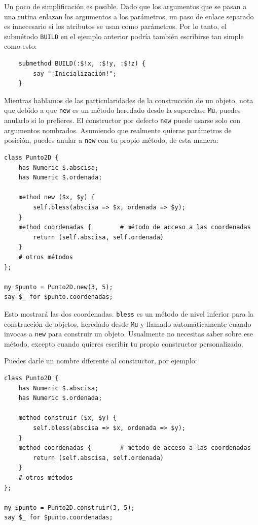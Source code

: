 Un poco de simplificación es posible. Dado que los argumentos
que se pasan a una rutina enlazan los argumentos a los parámetros,
un paso de enlace separado es innecesario si los atributos se usan
como parámetros. Por lo tanto, el submétodo {\tt BUILD} en el ejemplo
anterior podría también escribirse tan simple como esto:

\begin{verbatim}
    submethod BUILD(:$!x, :$!y, :$!z) {
        say "¡Inicialización!";
    }
\end{verbatim}


Mientras hablamos de las particularidades de la construcción de un objeto,
nota que debido a que {\tt new} es un método heredado desde la superclase
{\tt Mu}, puedes anularlo si lo prefieres. El constructor por defecto
{\tt new} puede usarse solo con argumentos nombrados. Asumiendo que realmente
quieras parámetros de posición, puedes anular a {\tt new} con tu 
propio método, de esta manera:

\begin{verbatim}
class Punto2D {
    has Numeric $.abscisa;
    has Numeric $.ordenada;

    method new ($x, $y) {
        self.bless(abscisa => $x, ordenada => $y);
    }
    method coordenadas {        # método de acceso a las coordenadas
        return (self.abscisa, self.ordenada)
    }
    # otros métodos
};

my $punto = Punto2D.new(3, 5);
say $_ for $punto.coordenadas;
\end{verbatim}

Esto mostrará las dos coordenadas. {\tt bless} es un método
de nivel inferior para la construcción de objetos, heredado
desde {\tt Mu} y llamado automáticamente cuando invocas a {\tt new}
para construir un objeto. Usualmente no necesitas saber sobre 
ese método, excepto cuando quieres escribir tu propio
constructor personalizado.

Puedes darle un nombre diferente al constructor, por ejemplo:

\begin{verbatim}
class Punto2D {
    has Numeric $.abscisa;
    has Numeric $.ordenada;

    method construir ($x, $y) {
        self.bless(abscisa => $x, ordenada => $y);
    }
    method coordenadas {        # método de acceso a las coordenadas
        return (self.abscisa, self.ordenada)
    }
    # otros métodos
};

my $punto = Punto2D.construir(3, 5);
say $_ for $punto.coordenadas;
\end{verbatim}

